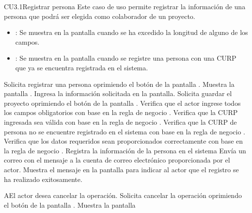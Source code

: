 \begin{UseCase}{CU3.1}{Registrar persona}{
	Este caso de uso permite registrar la información de una persona que podrá ser elegida como colaborador de un proyecto.
	}
{\begin{itemize}
		\item {}: Se muestra en la pantalla  cuando se ha excedido la longitud de alguno de los campos.
		\item {}: Se muestra en la pantalla  cuando se registre una persona con una CURP que ya se encuentra registrada en el sistema.
		\end{itemize}
		}
	\end{UseCase}
	\begin{UCtrayectoria}
		\UCpaso[\UCactor] Solicita registrar una persona oprimiendo el botón  de la pantalla .
		\UCpaso[\UCsist] Muestra la pantalla .
		\UCpaso[\UCactor] Ingresa la información solicitada en la pantalla. \label{CU3.1-P3}
		\UCpaso[\UCactor] Solicita guardar el proyecto oprimiendo el botón  de la pantalla . 
		\UCpaso[\UCsist] Verifica que el actor ingrese todos los campos obligatorios con base en la regla de negocio . 
		\UCpaso[\UCsist] Verifica que la CURP ingresada sea válida con base en la regla de negocio . 
		\UCpaso[\UCsist] Verifica que la CURP de persona no se encuentre registrado en el sistema con base en la regla de negocio . 
		\UCpaso[\UCsist] Verifica que los datos requeridos sean proporcionados correctamente con base en la regla de negocio .  
		\UCpaso[\UCsist] Registra la información de la persona en el sistema
		\UCpaso[\UCsist] Envía un correo con el mensaje  a la cuenta de correo electrónico proporcionada por el actor.
		\UCpaso[\UCsist] Muestra el mensaje  en la pantalla  para indicar al actor que el registro se ha realizado exitosamente.
	\end{UCtrayectoria}		
		\begin{UCtrayectoriaA}{A}{El actor desea cancelar la operación.}
			\UCpaso[\UCactor] Solicita cancelar la operación oprimiendo el botón  de la pantalla .
			\UCpaso[\UCsist] Muestra la pantalla 
		\end{UCtrayectoriaA}

